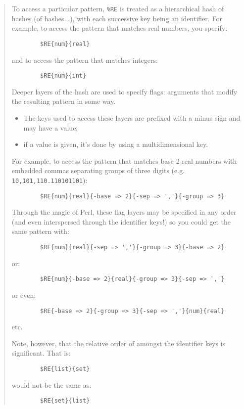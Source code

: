 \begin{it}
\begin{quote}
To access a particular pattern, \verb|%RE| is treated as a hierarchical hash of
hashes (of hashes...), with each successive key being an identifier. For
example, to access the pattern that matches real numbers, you specify:

\begin{verbatim}
        $RE{num}{real}
\end{verbatim}

and to access the pattern that matches integers:

\begin{verbatim}
        $RE{num}{int}
\end{verbatim}

Deeper layers of the hash are used to specify flags: 
arguments that modify
the resulting pattern in some way. 

\begin{itemize}
\item
The keys used to access these layers
are prefixed with a minus sign and may have a value; 
\item
if a value is given,
it's done by using a multidimensional key. 
\end{itemize}
For example, to access the
pattern that matches base-2 real numbers with embedded commas separating
groups of three digits (e.g. \verb|10,101,110.110101101|):

\begin{verbatim}
        $RE{num}{real}{-base => 2}{-sep => ','}{-group => 3}
\end{verbatim}

Through the magic of Perl, these flag layers may be specified in any
order (and even interspersed through the identifier keys!) so you could
get the same pattern with:

\begin{verbatim}
        $RE{num}{real}{-sep => ','}{-group => 3}{-base => 2}
\end{verbatim}

or:

\begin{verbatim}
        $RE{num}{-base => 2}{real}{-group => 3}{-sep => ','}
\end{verbatim}

or even:

\begin{verbatim}
        $RE{-base => 2}{-group => 3}{-sep => ','}{num}{real}
\end{verbatim}

etc.

Note, however, that the relative order of amongst the identifier keys is significant. That is:

\begin{verbatim}
        $RE{list}{set}
\end{verbatim}

would not be the same as:

\begin{verbatim}
        $RE{set}{list}
\end{verbatim}
\end{quote}
\end{it}

